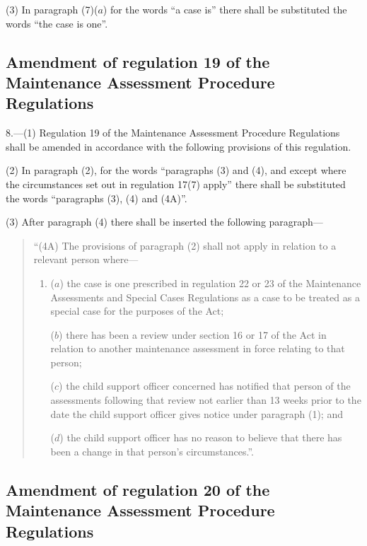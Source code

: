 \documentclass[12pt,a4paper]{article}
\begin{document}
(3) In paragraph (7)($a$) for the words “a case is” there shall be substituted the words “the case is one”.

\subsection[8. Amendment of regulation 19 of the Maintenance Assessment Procedure Regulations]{Amendment of regulation 19 of the Maintenance Assessment Procedure Regulations}

8.—(1) Regulation 19 of the Maintenance Assessment Procedure Regulations shall be amended in accordance with the following provisions of this regulation.

(2) In paragraph (2), for the words “paragraphs (3) and (4), and except where the circumstances set out in regulation 17(7) apply” there shall be substituted the words “paragraphs (3), (4) and (4A)”.

(3) After paragraph (4) there shall be inserted the following paragraph---
\begin{quotation}
“(4A) The provisions of paragraph (2) shall not apply in relation to a relevant person where---
\begin{enumerate}\item[]
($a$) the case is one prescribed in regulation 22 or 23 of the Maintenance Assessments and Special Cases Regulations as a case to be treated as a special case for the purposes of the Act;

($b$) there has been a review under section 16 or 17 of the Act in relation to another maintenance assessment in force relating to that person;

($c$) the child support officer concerned has notified that person of the assessments following that review not earlier than 13 weeks prior to the date the child support officer gives notice under paragraph (1); and

($d$) the child support officer has no reason to believe that there has been a change in that person’s circumstances.”.
\end{enumerate}
\end{quotation}

\subsection[9. Amendment of regulation 20 of the Maintenance Assessment Procedure Regulations]{Amendment of regulation 20 of the Maintenance Assessment Procedure Regulations}
\end{document}

